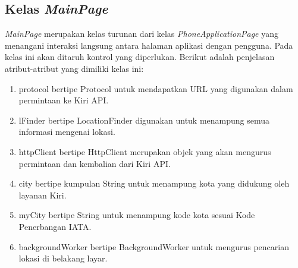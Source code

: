 \subsection{Kelas \textit{MainPage}}
\label{lab:Kelas MainPage}
\hspace{0.5cm} \textit{MainPage} merupakan kelas turunan dari kelas \textit{PhoneApplicationPage} yang menangani interaksi langsung antara halaman aplikasi dengan pengguna. Pada kelas ini akan ditaruh kontrol yang diperlukan. Berikut adalah penjelasan atribut-atribut yang dimiliki kelas ini:
\begin{enumerate}
	\item protocol bertipe Protocol untuk mendapatkan URL yang digunakan dalam permintaan ke Kiri API.
	\item lFinder bertipe LocationFinder digunakan untuk menampung semua informasi mengenai lokasi.
	\item httpClient bertipe HttpClient merupakan objek yang akan mengurus permintaan dan kembalian dari Kiri API.
	\item city bertipe kumpulan String untuk menampung kota yang didukung oleh layanan Kiri.
	\item myCity bertipe String untuk menampung kode kota sesuai Kode Penerbangan IATA.
	\item backgroundWorker bertipe BackgroundWorker untuk mengurus pencarian lokasi di belakang layar.
\end{enumerate}

